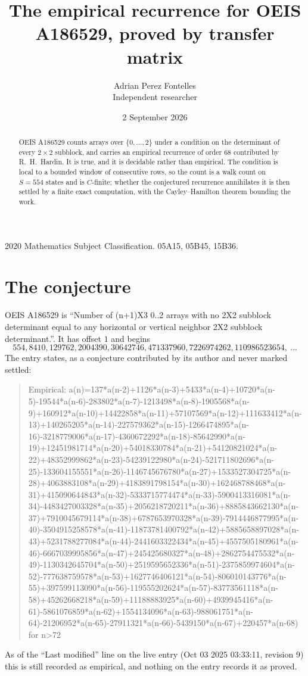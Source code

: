 \documentclass[11pt,a4paper]{article}
\title{The empirical recurrence for OEIS A186529, proved by transfer matrix}
\author{Adrian Perez Fontelles\\ \small Independent researcher}
\date{2 September 2026}
\theoremstyle{plain}
\theoremstyle{definition}
\begin{document}
\maketitle

\begin{abstract}
OEIS A186529 counts arrays over $\{0,\dots,2\}$ under a condition on the determinant of every
$2\times2$ subblock, and carries an empirical recurrence of order $68$ contributed by
R.~H.~Hardin. It is true, and it is decidable rather than empirical. The condition is local to
a bounded window of consecutive rows, so the count is a walk count on $S=554$ states and is
$C$-finite; whether the conjectured recurrence annihilates it is then settled by a finite exact
computation, with the Cayley--Hamilton theorem bounding the work.
\end{abstract}

\noindent\small 2020 Mathematics Subject Classification. 05A15, 05B45, 15B36.\normalsize

\section{The conjecture}

OEIS A186529 is ``Number of (n+1)X3 0..2 arrays with no 2X2 subblock determinant equal to any horizontal or vertical neighbor 2X2 subblock determinant.''. It has offset $1$ and begins
\[
554, 8410, 129762, 2004390, 30642746, 471337960, 7226974262, 110986523654,\ \dots
\]
The entry states, as a conjecture contributed by its author and never marked settled:
\begin{quote}
Empirical: a(n)=137*a(n-2)+1126*a(n-3)+5433*a(n-4)+10720*a(n-5)-19544*a(n-6)-283802*a(n-7)-1213498*a(n-8)-1905568*a(n-9)+160912*a(n-10)+14422858*a(n-11)+57107569*a(n-12)+111633412*a(n-13)+140265205*a(n-14)-227579362*a(n-15)-1266474895*a(n-16)-3218779006*a(n-17)-4360672292*a(n-18)-85642990*a(n-19)+12451981714*a(n-20)+54018330784*a(n-21)+54120821024*a(n-22)+48352999862*a(n-23)-54239122980*a(n-24)-521711802696*a(n-25)-133604155551*a(n-26)-1146745676780*a(n-27)+1533527304725*a(n-28)+4063883108*a(n-29)+4183891798154*a(n-30)+162468788468*a(n-31)+415090644843*a(n-32)-5333715774474*a(n-33)-5900413316081*a(n-34)-4483427003328*a(n-35)+2056218720211*a(n-36)+8885843662130*a(n-37)+7910045679114*a(n-38)+6787653970328*a(n-39)-7914446877995*a(n-40)-3504915258578*a(n-41)-11873781400792*a(n-42)+5885658897028*a(n-43)+5231788277084*a(n-44)-2441603322434*a(n-45)+4557505180961*a(n-46)-6667039995856*a(n-47)+245425680327*a(n-48)+2862754475532*a(n-49)-1130342645704*a(n-50)+2519595652336*a(n-51)-2375859974604*a(n-52)-777638759578*a(n-53)+1627746406121*a(n-54)-806010143776*a(n-55)+397599113090*a(n-56)-119555202624*a(n-57)-83773561118*a(n-58)+45262668218*a(n-59)+11188883925*a(n-60)+4939945416*a(n-61)-5861076859*a(n-62)+1554134096*a(n-63)-988061751*a(n-64)-21206952*a(n-65)-27911321*a(n-66)-5439150*a(n-67)+220457*a(n-68) for n>72
\end{quote}
As of the ``Last modified'' line on the live entry (Oct 03 2025 03:33:11, revision 9) this is still
recorded as empirical, and nothing on the entry records it as proved.
\end{document}
